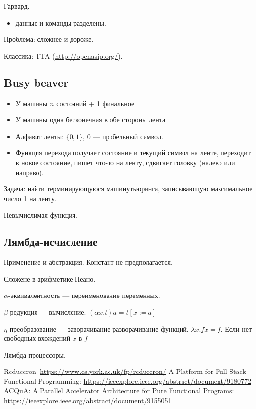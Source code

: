 Гарвард.
\begin{itemize}
	\item данные и команды разделены. 
\end{itemize}

Проблема: сложнее и дороже. 

Классика: TTA (\url{http://openasip.org/}).




\subsection{Busy beaver}

\begin{itemize}
	\item У машины $n$ состояний + 1 финальное
    \item У машины одна бесконечная в обе стороны лента
    \item Алфавит ленты: $\{0, 1\}$, 0 --- пробельный символ.
    \item Функция перехода получает состояние и текущий символ на ленте, переходит в новое состояние, пишет что-то на ленту, сдвигает головку (налево или направо).
\end{itemize}


Задача: найти терминирующуюся машинутьюринга, записывающую максимальное число 1 на ленту.

Невычислимая функция. 



\subsection{Лямбда-исчисление}

Применение и абстракция. Констант не предполагается.


Сложене в арифметике Пеано.

$\alpha$-эквивалентность --- переименование переменных.

$\beta$-редукция --- вычисление. $(\alpha x.t) a = t[x:=a]$   

$\eta$-преобразование --- заворачивание-разворачивание функций. $\lambda x . f x = f$. Если нет свободных вхождений $x$ в $f$ 

Лямбда-процессоры.

Reduceron: \url{https://www.cs.york.ac.uk/fp/reduceron/}
A Platform for Full-Stack Functional Programming: \url{https://ieeexplore.ieee.org/abstract/document/9180772}
ACQuA: A Parallel Accelerator Architecture for Pure Functional Programs: \url{https://ieeexplore.ieee.org/abstract/document/9155051}

